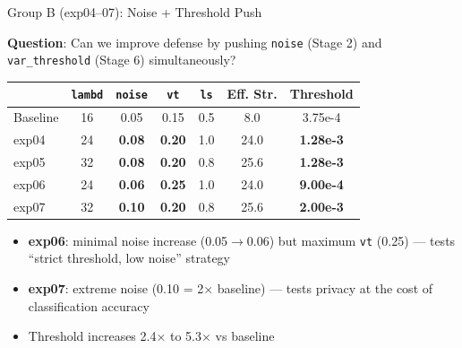 \documentclass[aspectratio=169, 10pt]{beamer}
\newcommand{\param}[1]{\textcolor{paramred}{\texttt{#1}}}
\begin{document}
\begin{frame}{Group B (exp04--07): Noise + Threshold Push}

\textbf{Question}: Can we improve defense by pushing \param{noise} (Stage 2) and \param{var\_threshold} (Stage 6) simultaneously?

\vspace{0.2cm}
\begin{center}
\small
\begin{tabular}{lcccccc}
\toprule
& \param{lambd} & \param{noise} & \param{vt} & \param{ls} & \textbf{Eff. Str.} & \textbf{Threshold} \\
\midrule
\rowcolor{lightgray}
Baseline & 16 & 0.05 & 0.15 & 0.5 & 8.0 & 3.75e-4 \\
exp04 & 24 & \textbf{0.08} & \textbf{0.20} & 1.0 & 24.0 & \textbf{1.28e-3} \\
exp05 & 32 & \textbf{0.08} & \textbf{0.20} & 0.8 & 25.6 & \textbf{1.28e-3} \\
exp06 & 24 & \textbf{0.06} & \textbf{0.25} & 1.0 & 24.0 & \textbf{9.00e-4} \\
exp07 & 32 & \textbf{0.10} & \textbf{0.20} & 0.8 & 25.6 & \textbf{2.00e-3} \\
\bottomrule
\end{tabular}
\end{center}

\vspace{0.2cm}
\begin{itemize}
    \item \textbf{exp06}: minimal noise increase (0.05$\to$0.06) but maximum \param{vt} (0.25) --- tests ``strict threshold, low noise'' strategy
    \item \textbf{exp07}: extreme noise (0.10 = 2$\times$ baseline) --- tests privacy at the cost of classification accuracy
    \item Threshold increases 2.4$\times$ to 5.3$\times$ vs baseline
\end{itemize}

\end{frame}
\end{document}
